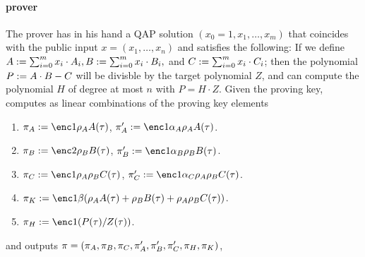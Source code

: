 \documentclass[11pt]{article}
\numberwithin{equation}{section} %
\numberwithin{figure}{section} %
\begin{document}
% 
% 
% 
% 
%  
% 
\paragraph{\bctv prover\\}
The prover has in his hand a QAP solution $(x_0=1,x_1,\ldots,x_m)$ that coincides with the public input $x=(x_1,\ldots,x_n)$ and satisfies the following:
If we define $A:= \sum_{i=0}^m x_i\cdot A_i, B:= \sum_{i=0}^m x_i \cdot B_i,$ and $C:= \sum_{i=0}^m x_i \cdot C_i$;
then the polynomial $P:= A\cdot B - C$ will be divisble by the target polynomial $Z$, and \per can compute the polynomial $H$ of degree at most $n$ with $P=H\cdot Z$.
Given the proving key, \per computes as linear combinations of the proving key elements
\begin{enumerate}
\item $\pi_A\defeq \enc1{\rho_A A(\tau)}$, $\pi'_A\defeq \enc1{\alpha_A\rho_A A(\tau)}$.
\item $\pi_B\defeq \enc2{\rho_B B(\tau)}$, $\pi'_B \defeq \enc1{\alpha_B\rho_B B(\tau)}$.
\item $\pi_C\defeq \enc1{\rho_A\rho_B C(\tau)}$, $\pi'_C \defeq \enc1{\alpha_C\rho_A\rho_B C(\tau)}$.
\item $\pi_K\defeq \enc1{\beta(\rho_A A(\tau) + \rho_B B(\tau) + \rho_A\rho_B C(\tau))}$.
\item $\pi_H\defeq \enc1{(P(\tau)/Z(\tau))}$.
 \end{enumerate}
 and outputs $\pi = (\pi_A,\pi_B,\pi_C,\pi'_A,\pi'_B,\pi'_C,\pi_H,\pi_K)$,
 
\end{document}
